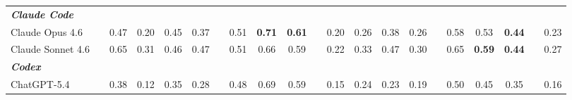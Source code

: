 \begin{table}[t]
{\begin{tabular}{@{}l c cccc c ccc c cccc c ccc c c@{}}
    \rowcolor{EvoPurple}
    \textit{\textbf{Claude Code}}
    & \vsep
    & \multicolumn{4}{c}{}
    & \vsep
    & \multicolumn{3}{c}{}
    & \vsep
    & \multicolumn{4}{c}{}
    & \vsep
    & \multicolumn{3}{c}{}
    & \vsep
    & \\
    
    Claude Opus 4.6
    & \vsep
    & 0.47 & 0.20 & 0.45 & 0.37
    & \vsep
    & 0.51 & \textbf{0.71} & \textbf{0.61}
    & \vsep
    & 0.20 & 0.26 & 0.38 & 0.26
    & \vsep
    & 0.58 & 0.53 & \textbf{0.44}
    & \vsep
    & 0.23 \\
    
    Claude Sonnet 4.6
    & \vsep
    & 0.65 & 0.31 & 0.46 & 0.47
    & \vsep
    & 0.51 & 0.66 & 0.59
    & \vsep
    & 0.22 & 0.33 & 0.47 & 0.30
    & \vsep
    & 0.65 & \textbf{0.59} & \textbf{0.44}
    & \vsep
    & 0.27 \\
    
    \hline
    
    \rowcolor{myVeryLightYellow}
    \textit{\textbf{Codex}}
    & \vsep
    & \multicolumn{4}{c}{}
    & \vsep
    & \multicolumn{3}{c}{}
    & \vsep
    & \multicolumn{4}{c}{}
    & \vsep
    & \multicolumn{3}{c}{}
    & \vsep
    & \\
    
    ChatGPT-5.4
    & \vsep
    & 0.38 & 0.12 & 0.35 & 0.28
    & \vsep
    & 0.48 & 0.69 & 0.59
    & \vsep
    & 0.15 & 0.24 & 0.23 & 0.19
    & \vsep
    & 0.50 & 0.45 & 0.35
    & \vsep
    & 0.16 \\
    
    \hline
    \end{tabular}%
    }
    \vspace{-0.5cm}
    \end{table}
